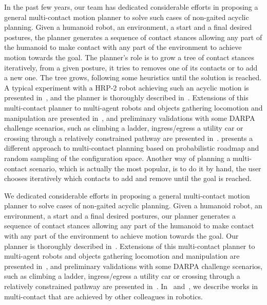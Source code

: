 In the past few years, our team has dedicated considerable efforts in proposing a general multi-contact motion planner to solve such cases of non-gaited acyclic planning.
Given a humanoid robot, an environment, a start and a final desired postures, the planner generates a sequence of contact stances allowing any part of the humanoid to make contact with any part of the environment to achieve motion towards the goal.
The planner's role is to grow a tree of contact stances iteratively, from a given posture, it tries to removes one of its contacts or to add a new one.
The tree grows, following some heuristics until the solution is reached.
A typical experiment with a HRP-2 robot achieving such an acyclic motion is presented in~\cite{escande:iser:2008}, and the planner is thoroughly described in~\cite{escande:ras:2013}.
Extensions of this multi-contact planner to multi-agent robots and objects gathering locomotion and manipulation are presented in~\cite{bouyarmane:ar:2012}, and preliminary validations with some DARPA challenge scenarios, such as climbing a ladder, ingress/egress a utility car or crossing through a relatively constrained pathway are presented in~\cite{bouyarmane:humanoids:2012}.
\cite{hauser:issr:2007} presents a different approach to multi-contact planning based on probabilistic roadmap and random sampling of the configuration space.
Another way of planning a multi-contact scenario, which is actually the most popular, is to do it by hand, the user chooses iteratively which contacts to add and remove until the goal is reached.

We dedicated considerable efforts in proposing a general multi-contact motion planner to solve cases of non-gaited acyclic planning.
Given a humanoid robot, an environment, a start and a final desired postures, our planner generates a sequence of contact stances allowing any part of the humanoid to make contact with any part of the environment to achieve motion towards the goal.
Our planner is thoroughly described in~\cite{escande:ras:2013}.
Extensions of this multi-contact planner to multi-agent robots and objects gathering locomotion and manipulation are presented in~\cite{bouyarmane:ar:2012}, and preliminary validations with some DARPA challenge scenarios, such as climbing a ladder, ingress/egress a utility car or crossing through a relatively constrained pathway are presented in~\cite{bouyarmane:humanoids:2012}.
In~\cite{escande:ras:2013} and~\cite{bouyarmane:ar:2012}, we describe works in multi-contact that are achieved by other colleagues in robotics.

